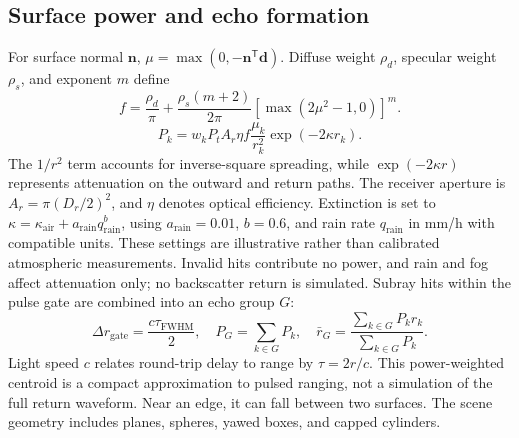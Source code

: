 \documentclass[11pt,letterpaper]{article}
\newcommand{\vect}[1]{\mathbf #1}
\begin{document}
\subsection{Surface power and echo formation}
For surface normal $\vect n$, $\mu=\max(0,-\vect n^{\mathsf T}\vect d)$. Diffuse weight $\rho_d$, specular weight $\rho_s$, and exponent $m$ define
\begin{equation}\label{eq:brdf}
f=\frac{\rho_d}{\pi}+\frac{\rho_s(m+2)}{2\pi}[\max(2\mu^2-1,0)]^m.
\end{equation}
\begin{equation}\label{eq:power}
P_k=w_kP_tA_r\eta f\frac{\mu_k}{r_k^2}\exp(-2\kappa r_k).
\end{equation}
The $1/r^2$ term accounts for inverse-square spreading, while $\exp(-2\kappa r)$ represents attenuation on the outward and return paths. The receiver aperture is $A_r=\pi(D_r/2)^2$, and $\eta$ denotes optical efficiency. Extinction is set to $\kappa=\kappa_{\mathrm{air}}+a_{\mathrm{rain}}q_{\mathrm{rain}}^b$, using $a_{\mathrm{rain}}=0.01$, $b=0.6$, and rain rate $q_{\mathrm{rain}}$ in mm/h with compatible units. These settings are illustrative rather than calibrated atmospheric measurements. Invalid hits contribute no power, and rain and fog affect attenuation only; no backscatter return is simulated. Subray hits within the pulse gate are combined into an echo group $G$:
\begin{equation}\label{eq:echo}
\Delta r_{\mathrm{gate}}=\frac{c\tau_{\mathrm{FWHM}}}{2},\quad
P_G=\sum_{k\in G}P_k,\quad \bar r_G=\frac{\sum_{k\in G}P_kr_k}{\sum_{k\in G}P_k}.
\end{equation}
Light speed $c$ relates round-trip delay to range by $\tau=2r/c$. This power-weighted centroid is a compact approximation to pulsed ranging, not a simulation of the full return waveform. Near an edge, it can fall between two surfaces. The scene geometry includes planes, spheres, yawed boxes, and capped cylinders.
\end{document}
